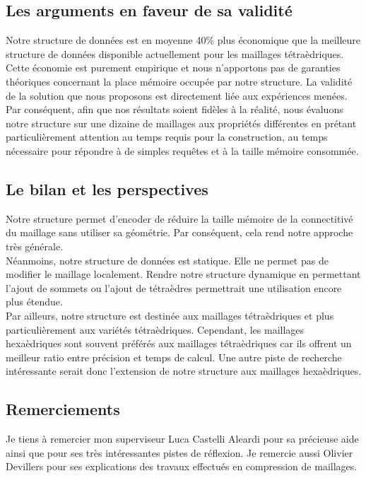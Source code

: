 \subsection*{Les arguments en faveur de sa validité}
\noindent
Notre structure de données est en moyenne 40\% plus économique que la meilleure structure de données disponible actuellement pour les maillages tétraèdriques. Cette économie est purement empirique et nous n'apportons pas de garanties théoriques concernant la place mémoire occupée par notre structure. La validité de la solution que nous proposons est directement liée aux expériences menées. Par conséquent, afin que nos résultats soient fidèles à la réalité, nous évaluons notre structure sur une dizaine de maillages aux propriétés différentes en prétant particulièrement attention au temps requis pour la construction, au temps nécessaire pour répondre à de simples requêtes et à la taille mémoire consommée.

\subsection*{Le bilan et les perspectives}
\noindent
Notre structure permet d'encoder de réduire la taille mémoire de la connectitivé du maillage sans utiliser sa géométrie. Par conséquent, cela rend notre approche très générale.\\
Néanmoins, notre structure de données est statique. Elle ne permet pas de modifier le maillage localement. Rendre notre structure dynamique en permettant l'ajout de sommets ou l'ajout de tétraèdres permettrait une utilisation encore plus étendue.\\
Par ailleurs, notre structure est destinée aux maillages tétraèdriques et plus particulièrement aux variétés tétraèdriques. Cependant, les maillages hexaèdriques sont souvent préférés aux maillages tétraèdriques car ils offrent un meilleur ratio entre précision et temps de calcul. Une autre piste de recherche intéressante serait donc l'extension de notre structure aux maillages hexaèdriques.

\subsection*{Remerciements}
\noindent
Je tiens à remercier mon superviseur Luca Castelli Aleardi pour sa précieuse aide ainsi que pour ses très intéressantes pistes de réflexion. Je remercie aussi Olivier Devillers pour ses explications des travaux effectués en compression de maillages.

